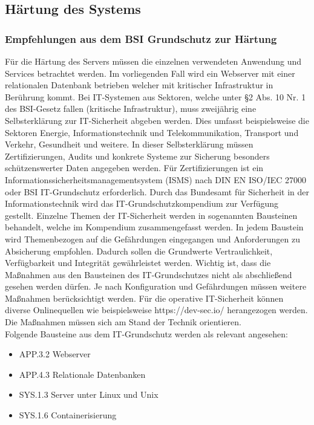 \newpage
\subsection{Härtung des Systems}\label{kap:haertung_des_systems}


\newpage
\subsubsection{Empfehlungen aus dem BSI Grundschutz zur Härtung}

F\"ur die H\"artung des Servers m\"ussen die einzelnen verwendeten Anwendung und Services betrachtet werden. Im vorliegenden Fall wird ein Webserver mit einer relationalen Datenbank betrieben welcher mit kritischer Infrastruktur in Ber\"uhrung kommt. Bei IT-Systemen aus Sektoren, welche unter \S2 Abs. 10 Nr. 1 des BSI-Gesetz fallen (kritische Infrastruktur), muss zweij\"ahrig eine Selbsterkl\"arung zur IT-Sicherheit abgeben werden. Dies umfasst beispielsweise die Sektoren Energie, Informationstechnik und Telekommunikation, Transport und Verkehr, Gesundheit und weitere. In dieser Selbsterkl\"arung m\"ussen Zertifizierungen, Audits und konkrete Systeme zur Sicherung besonders sch\"utzenswerter Daten angegeben werden. F\"ur Zertifizierungen ist ein Informationssicherheitsmanagementsystem (ISMS) nach DIN EN ISO/IEC 27000 oder BSI IT-Grundschutz erforderlich. Durch das Bundesamt f\"ur Sicherheit in der Informationstechnik wird das IT-Grundschutzkompendium zur Verf\"ugung gestellt.  Einzelne Themen der IT-Sicherheit werden in sogenannten Bausteinen behandelt, welche im Kompendium zusammengefasst werden. In jedem Baustein wird Themenbezogen auf die Gef\"ahrdungen eingegangen und Anforderungen zu Absicherung empfohlen. Dadurch sollen die Grundwerte Vertraulichkeit, Verf\"ugbarkeit und Integrit\"at gew\"ahrleistet werden. Wichtig ist, dass die Ma{\ss}nahmen aus den Bausteinen des IT-Grundschutzes nicht als abschlie{\ss}end gesehen werden d\"urfen. Je nach Konfiguration und Gef\"ahrdungen m\"ussen weitere Ma{\ss}nahmen ber\"ucksichtigt werden. F\"ur die operative IT-Sicherheit k\"onnen diverse Onlinequellen wie beispielsweise https://dev-sec.io/ herangezogen werden. Die Ma{\ss}nahmen m\"ussen sich am Stand der Technik orientieren. \\

Folgende Bausteine aus dem IT-Grundschutz werden als relevant angesehen:
  \begin{itemize}
      \item APP.3.2 Webserver
			\item APP.4.3 Relationale Datenbanken
      \item SYS.1.3 Server unter Linux und Unix
			\item SYS.1.6 Containerisierung
   \end{itemize} 


